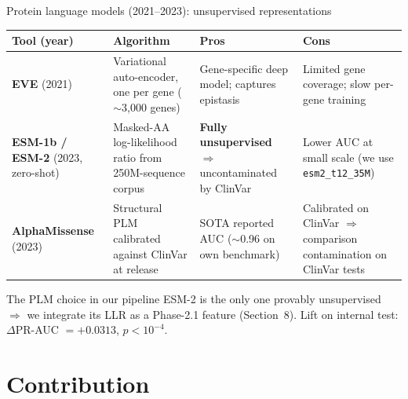 \documentclass[aspectratio=169,10pt]{beamer}
\begin{document}
\begin{frame}{Protein language models (2021--2023): unsupervised representations}
  \footnotesize
  \begin{tabular}{@{} p{1.7cm} p{2.7cm} p{2.9cm} p{2.9cm} @{}}
    \toprule
    \textbf{Tool (year)} & \textbf{Algorithm} & \textbf{\textcolor{green!40!black}{Pros}} & \textbf{\textcolor{red!70!black}{Cons}} \\
    \midrule
    \textbf{EVE} (2021) &
    Variational auto-encoder, one per gene ($\sim$3{,}000 genes) &
    Gene-specific deep model; captures epistasis &
    Limited gene coverage; slow per-gene training \\
    \midrule
    \textbf{ESM-1b / ESM-2} (2023, zero-shot) &
    Masked-AA log-likelihood ratio from 250M-sequence corpus &
    \textbf{Fully unsupervised} $\Rightarrow$ uncontaminated by ClinVar &
    Lower AUC at small scale (we use \texttt{esm2\_t12\_35M}) \\
    \midrule
    \textbf{AlphaMissense} (2023) &
    Structural PLM calibrated against ClinVar at release &
    SOTA reported AUC ($\sim$0.96 on own benchmark) &
    \alert{Calibrated on ClinVar} $\Rightarrow$ comparison contamination on ClinVar tests \\
    \bottomrule
  \end{tabular}

  \vspace{0.4em}
  \begin{exampleblock}{The PLM choice in our pipeline}
    ESM-2 is the only one provably unsupervised $\Rightarrow$ we integrate its LLR
    as a Phase-2.1 feature (Section~8). Lift on internal test:
    $\Delta$PR-AUC $=+0.0313$, $p<10^{-4}$.
  \end{exampleblock}
\end{frame}

\section{Contribution}
\end{document}
